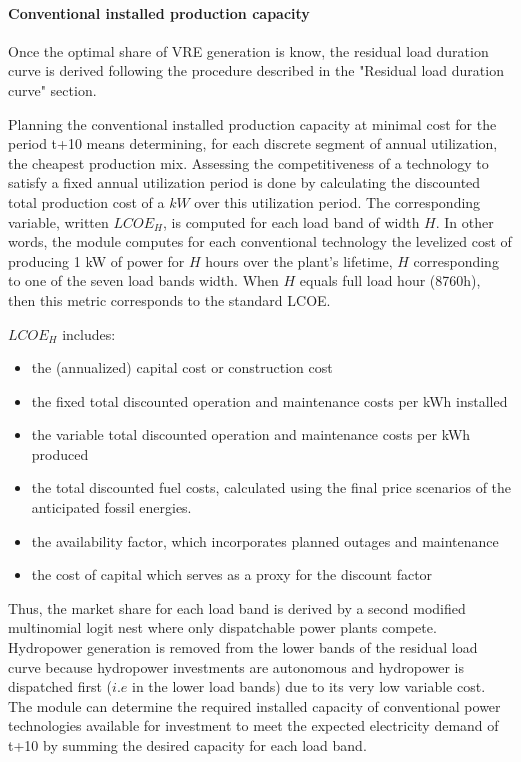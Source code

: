\paragraph{Conventional installed production capacity}

Once the optimal share of VRE generation is know, the residual load duration curve is derived following the procedure described in the "Residual load duration curve" section.



Planning the conventional installed production capacity at minimal cost for the period t+10 means determining, for each discrete segment of annual utilization, the cheapest production mix.
Assessing the competitiveness of a technology to satisfy a fixed annual utilization period is done by calculating the discounted total production cost of a
$kW$ over this utilization period.
The corresponding variable, written $LCOE_{H}$, is computed for each load band of width $H$. In other words, the module computes for each conventional technology the levelized cost of producing 1 kW of power for $H$ hours over the plant's lifetime, $H$ corresponding to one of the seven load bands width. When $H$ equals full load hour (8760h), then this metric corresponds to the standard LCOE.

$LCOE_{H}$ includes:

\begin{itemize}
    \item the (annualized) capital cost or construction cost
    \item the fixed total discounted operation and maintenance costs per kWh installed
    \item the variable total discounted operation and maintenance costs per kWh produced
    \item the total discounted fuel costs, calculated using the final price scenarios of the anticipated fossil energies.
    \item  the availability factor, which incorporates planned outages and maintenance
    \item the cost of capital which serves as a proxy for the discount factor
\end{itemize}



Thus, the market share for each load band is derived by a second modified multinomial logit nest where only dispatchable power plants compete. Hydropower generation is removed from the lower bands of the residual load curve because hydropower investments are autonomous and hydropower is dispatched first ($i.e$ in the lower load bands) due to its very low variable cost. The module can determine the required installed capacity of conventional power technologies available for investment to meet the expected electricity demand of t+10 by summing the desired capacity for each load band.

